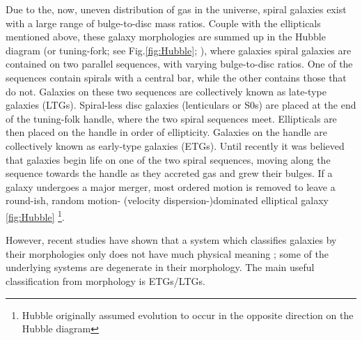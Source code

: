 	Due to the, now, uneven distribution of gas in the universe, spiral galaxies exist with a large range of bulge-to-disc mass ratios. Couple with the ellipticals mentioned above, these galaxy morphologies are summed up in the Hubble diagram (or tuning-fork; see Fig.\ref{fig:Hubble}; \citealt{Hubble1982, deVaucouleurs1959}), where galaxies spiral galaxies are contained on two parallel sequences, with varying bulge-to-disc ratios. One of the sequences contain spirals with a central bar, while the other contains those that do not. Galaxies on these two sequences are collectively known as late-type galaxies (LTGs). Spiral-less disc galaxies (lenticulars or S0s) are placed at the end of the tuning-folk handle, where the two spiral sequences meet. Ellipticals are then placed on the handle in order of ellipticity. Galaxies on the handle are collectively known as early-type galaxies (ETGs). Until recently it was believed that galaxies begin life on one of the two spiral sequences, moving along the sequence towards the handle as they accreted gas and grew their bulges. If a galaxy undergoes a major merger, most ordered motion is removed to leave a round-ish, random motion- (velocity dispersion-)dominated elliptical galaxy \ref{fig:Hubble} \footnote{Hubble originally assumed evolution to occur in the opposite direction on the Hubble diagram}. 

	However, recent studies have shown that a system which classifies galaxies by their morphologies only does not have much physical meaning \citep[e.g.][]{Cappellari2011, Sanchez2011, Arnold2013, Bryant2014}; some of the underlying systems are degenerate in their morphology. 
	The main useful classification from morphology is ETGs/LTGs. 

